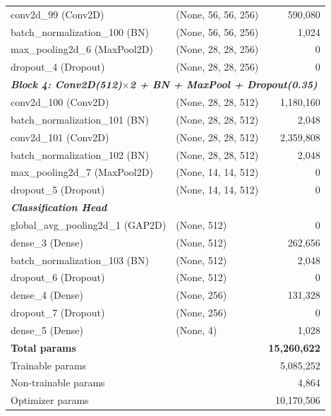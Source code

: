 \documentclass[12pt,a4paper]{article}
\begin{document}
\begin{table}[H]
\begin{tabular}{l l r}
  conv2d\_99 (Conv2D)                   & (None, 56, 56, 256)   &     590,080 \\
  batch\_normalization\_100 (BN)        & (None, 56, 56, 256)   &       1,024 \\
  max\_pooling2d\_6 (MaxPool2D)         & (None, 28, 28, 256)   &           0 \\
  dropout\_4 (Dropout)                  & (None, 28, 28, 256)   &           0 \\
  \midrule
  \multicolumn{3}{l}{\textit{\textbf{Block 4: Conv2D(512)$\times$2 + BN + MaxPool + Dropout(0.35)}}} \\
  conv2d\_100 (Conv2D)                  & (None, 28, 28, 512)   &   1,180,160 \\
  batch\_normalization\_101 (BN)        & (None, 28, 28, 512)   &       2,048 \\
  conv2d\_101 (Conv2D)                  & (None, 28, 28, 512)   &   2,359,808 \\
  batch\_normalization\_102 (BN)        & (None, 28, 28, 512)   &       2,048 \\
  max\_pooling2d\_7 (MaxPool2D)         & (None, 14, 14, 512)   &           0 \\
  dropout\_5 (Dropout)                  & (None, 14, 14, 512)   &           0 \\
  \midrule
  \multicolumn{3}{l}{\textit{\textbf{Classification Head}}} \\
  global\_avg\_pooling2d\_1 (GAP2D)     & (None, 512)           &           0 \\
  dense\_3 (Dense)                      & (None, 512)           &     262,656 \\
  batch\_normalization\_103 (BN)        & (None, 512)           &       2,048 \\
  dropout\_6 (Dropout)                  & (None, 512)           &           0 \\
  dense\_4 (Dense)                      & (None, 256)           &     131,328 \\
  dropout\_7 (Dropout)                  & (None, 256)           &           0 \\
  dense\_5 (Dense)                      & (None, 4)             &       1,028 \\
  \midrule
  \multicolumn{2}{l}{\textbf{Total params}}    & \textbf{15,260,622} \\
  \multicolumn{2}{l}{Trainable params}         &       5,085,252 \\
  \multicolumn{2}{l}{Non-trainable params}     &           4,864 \\
  \multicolumn{2}{l}{Optimizer params}         &      10,170,506 \\
  \bottomrule
\end{tabular}
\end{table}
\end{document}
